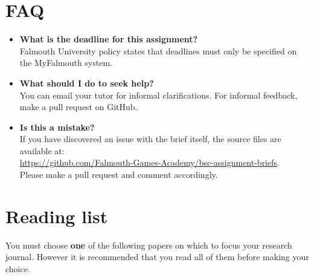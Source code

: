 \documentclass{../../fal_assignment}
\begin{document}
\section*{FAQ}

\begin{itemize}
	\item 	\textbf{What is the deadline for this assignment?} \\ 
    		Falmouth University policy states that deadlines must only be specified on the MyFalmouth system.
    		
	\item 	\textbf{What should I do to seek help?} \\ 
    		You can email your tutor for informal clarifications. For informal feedback, make a pull request on GitHub. 
    		
    	\item 	\textbf{Is this a mistake?} \\ 	
    		If you have discovered an issue with the brief itself, the source files are available at: \\
    		\url{https://github.com/Falmouth-Games-Academy/bsc-assignment-briefs}.\\
    		 Please make a pull request and comment accordingly.
\end{itemize}

\section*{Reading list}

You must choose \textbf{one} of the following papers on which to focus your research journal.
However it is recommended that you read all of them before making your choice.


%
\end{document}
